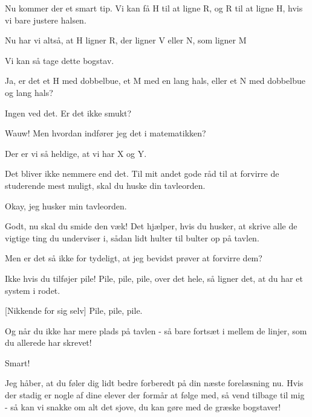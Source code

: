 \documentclass[a4paper,11pt]{article}
\begin{document}
\begin{sketch}
 Nu kommer der et smart tip. Vi kan få H til at ligne R, og R til at ligne H, hvis vi bare justere halsen. 

 Nu har vi altså, at H ligner R, der ligner V eller N, som ligner M 

 Vi kan så tage dette bogstav. 

 Ja, er det et H med dobbelbue, et M med en lang hals, eller et N med dobbelbue og lang hals? 

 Ingen ved det. Er det ikke smukt?


 Wauw! Men hvordan indfører jeg det i matematikken?

 Der er vi så heldige, at vi har X og Y. 


 Det bliver ikke nemmere end det. Til mit andet gode råd til at forvirre de studerende mest muligt, skal du huske din tavleorden.

 Okay, jeg husker min tavleorden.

 Godt, nu skal du smide den væk! Det hjælper, hvis du husker, at skrive alle de vigtige ting du underviser i, sådan lidt hulter til bulter op på tavlen.

 Men er det så ikke for tydeligt, at jeg bevidst prøver at forvirre dem?

 Ikke hvis du tilføjer pile! Pile, pile, pile, over det hele, så ligner det, at du har et system i rodet.

[Nikkende for sig selv] Pile, pile, pile.

 Og når du ikke har mere plads på tavlen - så bare fortsæt i mellem de linjer, som du allerede har skrevet!

 Smart!

 Jeg håber, at du føler dig lidt bedre forberedt på din næste forelæsning nu. Hvis der stadig er nogle af dine elever der formår at følge med, så vend tilbage til mig -  så kan vi snakke om alt det sjove, du kan gøre med de græske bogstaver!

\end{sketch}
\end{document}
